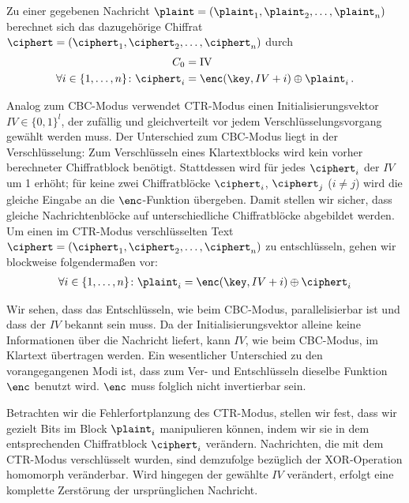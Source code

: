 Zu einer gegebenen Nachricht $\plaint = (\plaint_{1},\plaint_{2},\dots,\plaint_{n})$ berechnet sich das dazugehörige Chiffrat $\ciphert = (\ciphert_{1},\ciphert_{2}, \dots,\ciphert_{n})$ durch
\begin{align*}
  C_0 &= \text{IV}\\
  \forall i \in \{1,\dots,n\}\colon \ciphert_i &= \enc(\key, IV + i)
  \oplus \plaint_i\, . 
\end{align*}

Analog zum CBC-Modus verwendet CTR-Modus einen Initialisierungsvektor
$IV \in \{0,1\}^{l}$, der zufällig und gleichverteilt vor jedem
Verschlüsselungsvorgang gewählt werden muss. Der Unterschied zum
CBC-Modus liegt in der Verschlüsselung: Zum Verschlüsseln eines
Klartextblocks wird kein vorher berechneter Chiffratblock
benötigt. Stattdessen wird für jedes $\ciphert_i$ der $IV$ um 1 erhöht;
für keine zwei Chiffratblöcke $\ciphert_i$, $\ciphert_j$ ($i \neq j$)
wird die gleiche Eingabe an die $\enc$-Funktion übergeben. Damit stellen
wir sicher, dass gleiche Nachrichtenblöcke auf unterschiedliche
Chiffratblöcke abgebildet werden. Um einen im CTR-Modus verschlüsselten
Text $\ciphert = (\ciphert_{1},\ciphert_{2},\dots,\ciphert_{n})$ zu
entschlüsseln, gehen wir blockweise folgendermaßen vor:
\begin{align*}
  \forall i \in \{1,\dots,n\}\colon \plaint_i = \enc(\key, IV + i) \oplus \ciphert_i
\end{align*}

Wir sehen, dass das Entschlüsseln, wie beim CBC-Modus, parallelisierbar
ist und dass der $IV$ bekannt sein muss. Da der Initialisierungsvektor
alleine keine Informationen über die Nachricht liefert, kann $IV$, wie
beim CBC-Modus, im Klartext übertragen werden. Ein wesentlicher
Unterschied zu den vorangegangenen Modi ist, dass zum Ver- und
Entschlüsseln dieselbe Funktion $\enc$ benutzt wird. $\enc$ muss
folglich nicht invertierbar sein.

Betrachten wir die Fehlerfortplanzung des CTR-Modus, stellen wir fest,
dass wir gezielt Bits im Block $\plaint_i$ manipulieren können, indem
wir sie in dem entsprechenden Chiffratblock $\ciphert_i$
verändern. Nachrichten, die mit dem CTR-Modus verschlüsselt wurden, sind
demzufolge bezüglich der XOR-Operation homomorph veränderbar. Wird
hingegen der gewählte $IV$ verändert, erfolgt eine komplette Zerstörung
der ursprünglichen Nachricht.

